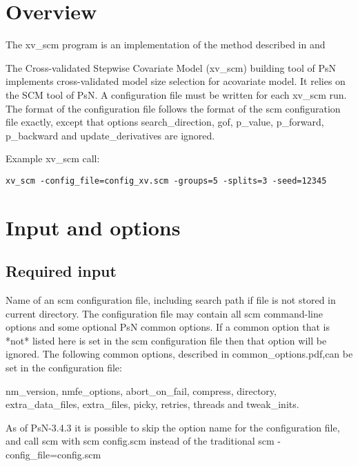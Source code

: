



\maketitle


\section{Overview}
The xv\_scm program is an implementation of the method described in \cite{Katsube1} and \cite{Katsube2} 

The Cross-validated Stepwise Covariate Model (xv\_scm) building tool of PsN implements cross-validated model 
size selection for acovariate model. It relies on the SCM tool of PsN.        
A configuration file must be written for each xv\_scm run. The format of the configuration file follows the format 
of the scm configuration file exactly, except that options  search\_direction, gof, p\_value, p\_forward, p\_backward 
and  update\_derivatives are ignored.

Example xv\_scm call:
\begin{verbatim}
xv_scm -config_file=config_xv.scm -groups=5 -splits=3 -seed=12345
\end{verbatim}

\section{Input and options}

\subsection{Required input}
Name of an scm configuration file, including search path if file is not stored in current directory. 
The configuration file may contain all scm command-line options and some optional PsN common options.
If a common option that is *not* listed here is set in the scm configuration file then that option 
will be ignored.
The following common options, described in common\_options.pdf,can be set in the configuration file: 

	\mbox{nm\_version}, \mbox{nmfe\_options}, \mbox{abort\_on\_fail}, \mbox{compress}, \mbox{directory}, 
	\mbox{extra\_data\_files}, \mbox{extra\_files}, \mbox{picky}, \mbox{retries}, \mbox{threads} and 
	\mbox{tweak\_inits}. 
	
As of PsN-3.4.3 it is possible to skip the option name for the configuration file, and call scm with 
scm config.scm instead of the traditional scm -config_file=config.scm
